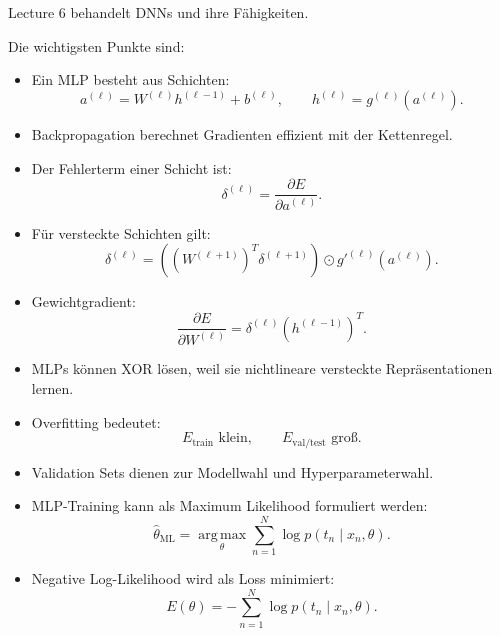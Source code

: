 \documentclass[11pt,a4paper]{scrartcl}
\begin{document}
\begin{answerbox}
    Lecture 6 behandelt DNNs und ihre Fähigkeiten.

    Die wichtigsten Punkte sind:

    \begin{itemize}
        \item Ein MLP besteht aus Schichten:
        \[
            a^{(\ell)}
            =
            W^{(\ell)}h^{(\ell-1)} + b^{(\ell)},
            \qquad
            h^{(\ell)}
            =
            g^{(\ell)}(a^{(\ell)}).
        \]

        \item Backpropagation berechnet Gradienten effizient mit der Kettenregel.

        \item Der Fehlerterm einer Schicht ist:
        \[
            \delta^{(\ell)}
            =
            \frac{\partial E}{\partial a^{(\ell)}}.
        \]

        \item Für versteckte Schichten gilt:
        \[
            \delta^{(\ell)}
            =
            \left(
                (W^{(\ell+1)})^T
                \delta^{(\ell+1)}
            \right)
            \odot
            g'^{(\ell)}(a^{(\ell)}).
        \]

        \item Gewichtgradient:
        \[
            \frac{\partial E}{\partial W^{(\ell)}}
            =
            \delta^{(\ell)}
            \left(h^{(\ell-1)}\right)^T.
        \]

        \item MLPs können XOR lösen, weil sie nichtlineare versteckte
        Repräsentationen lernen.

        \item Overfitting bedeutet:
        \[
            E_{\mathrm{train}} \text{ klein},
            \qquad
            E_{\mathrm{val/test}} \text{ groß}.
        \]

        \item Validation Sets dienen zur Modellwahl und Hyperparameterwahl.

        \item MLP-Training kann als Maximum Likelihood formuliert werden:
        \[
            \hat\theta_{\mathrm{ML}}
            =
            \operatorname*{arg\,max}_{\theta}
            \sum_{n=1}^{N}
            \log p(t_n \mid x_n,\theta).
        \]

        \item Negative Log-Likelihood wird als Loss minimiert:
        \[
            E(\theta)
            =
            -
            \sum_{n=1}^{N}
            \log p(t_n \mid x_n,\theta).
        \]


\end{itemize}
\end{answerbox}
\end{document}
